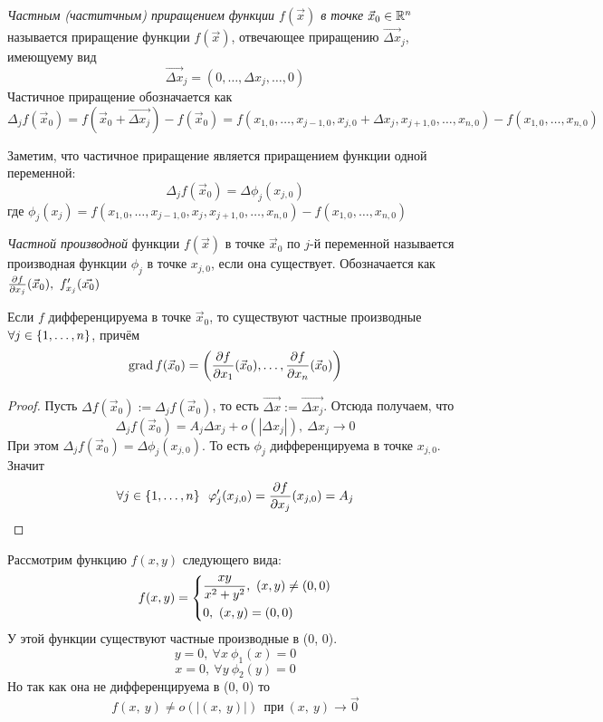 \begin{definition}
	\textit{Частным (частитчным) приращением функции $f(\vec{x})$ в точке} $\vec{x}_0 \in \mathbb{R}^n$ называется приращение функции $f(\vec{x})$, отвечающее 	приращению $\overrightarrow{\Delta x}_j$, имеющуему вид
	\[
		\overrightarrow{\Delta x}_j = (0, \ldots, \Delta x_j, \ldots, 0)
	\]
	Частичное приращение обозначается как
	\[
		\Delta_j f(\vec{x}_0) = f(\vec{x}_0 + \overrightarrow{\Delta x_j}) - f(\vec{x}_0) = f(x_{1, 0}, \ldots, x_{j - 1, 0}, x_{j, 0} + \Delta x_j, x_{j + 1, 0}, \ldots, x_{n, 0}) - f(x_{1, 0}, \ldots, x_{n, 0})
	\]
\end{definition}

\begin{note}
	Заметим, что частичное приращение является приращением функции одной переменной:
	\[
		\Delta_j f(\vec{x}_0) = \Delta \phi_j (x_{j, 0})
	\]
	где $\phi_j(x_j) = f(x_{1, 0}, \ldots, x_{j - 1, 0}, x_j, x_{j + 1, 0}, \ldots, x_{n, 0}) - f(x_{1, 0}, \ldots, x_{n, 0})$
\end{note}

\begin{definition}
	\textit{Частной производной} функции $f(\vec{x})$ в точке $\vec{x}_0$ по $j$-й переменной называется производная функции $\phi_j$ в точке $x_{j, 0}$, если она существует. Обозначается как $\frac{\vdelta f}{\vdelta x_j}(\vec{x}_0),\ f'_{x_j}(\vec{x_0})$
\end{definition}

\begin{theorem}
	Если $f$ дифференцируема в точке $\vec{x}_0$, то существуют частные производные $\forall j \in \{1, \ldots, n\}$, причём
	\[
		\operatorname{grad} f(\vec{x}_0) = \left(\frac{\partial f}{\partial x_1}(\vec{x}_0), \ldots, \frac{\partial f}{\partial x_n}(\vec{x}_0)\right)
	\]
\end{theorem}

\begin{proof}
	Пусть $\Delta f(\vec{x}_0) := \Delta_j f(\vec{x}_0)$, то есть $\overrightarrow{\Delta x} := \overrightarrow{\Delta x_j}$. Отсюда получаем, что
	\[
		\Delta_j f(\vec{x}_0) = A_j \Delta x_j + o(|\Delta x_j|),\ \Delta x_j \to 0
	\]
	При этом $\Delta_j f(\vec{x}_0) = \Delta \phi_j (x_{j, 0})$. То есть $\phi_j$ дифференцируема в точке $x_{j, 0}$. Значит
	\[
		\forall j \in \{1, \ldots, n\}\ \ \varphi'_j (x_{j, 0}) = \frac{\partial f}{\partial x_j} (x_{j, 0}) = A_j
	\]
\end{proof}

\begin{example}
	Рассмотрим функцию $f(x, y)$ следующего вида:
	\[
		f(x, y) = \left\{\begin{aligned}
			&{\frac{xy}{x^2 + y^2},\ (x, y) \neq (0, 0)}
			\\
			&{0,\ (x, y) = (0, 0)}
		\end{aligned}\right.
	\]
	У этой функции существуют частные производные в (0, 0).
	\[
		y = 0,\ \forall x \  \phi_1(x) = 0 
	\]
	\[
		x = 0,\ \forall y \ \phi_2(y) = 0
	\]
	Но так как она не дифференцируема в (0, 0) то
	\[
		f(x,\ y) \neq o(|(x,\ y)|) \ \ \text{при} \  (x,\ y) \to \vec{0}
	\]
\end{example}

